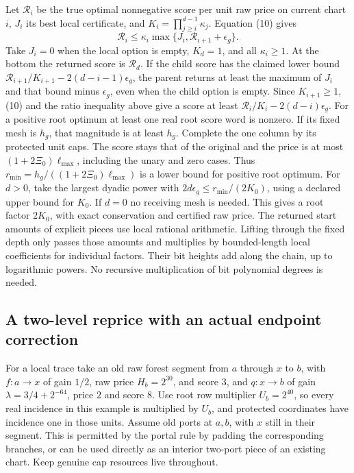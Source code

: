 \documentclass[11pt]{article}
\begin{document}
Let \(\mathcal R_i\) be the true optimal nonnegative score per unit raw price on current chart \(i\), \(J_i\) its best local certificate, and \(K_i=\prod_{j\ge i}^{d-1}\kappa_j\). Equation (10) gives
\[
 \mathcal R_i\le \kappa_i\max\{J_i,\mathcal R_{i+1}+\epsilon_g\}.
\]
Take \(J_i=0\) when the local option is empty, \(K_d=1\), and all \(\kappa_i\ge1\). At the bottom the returned score is \(\mathcal R_d\). If the child score has the claimed lower bound \(\mathcal R_{i+1}/K_{i+1}-2(d-i-1)\epsilon_g\), the parent returns at least the maximum of \(J_i\) and that bound minus \(\epsilon_g\), even when the child option is empty. Since \(K_{i+1}\ge1\), (10) and the ratio inequality above give a score at least \(\mathcal R_i/K_i-2(d-i)\epsilon_g\). For a positive root optimum at least one real root score word is nonzero. If its fixed mesh is \(h_g\), that magnitude is at least \(h_g\). Complete the one column by its protected unit caps. The score stays that of the original and the price is at most \((1+2\Xi_0)\ell_{\max}\), including the unary and zero cases. Thus \(r_{\min}=h_g/((1+2\Xi_0)\ell_{\max})\) is a lower bound for positive root optimum. For \(d>0\), take the largest dyadic power with \(2d\epsilon_g\le r_{\min}/(2K_0)\), using a declared upper bound for \(K_0\). If \(d=0\) no receiving mesh is needed. This gives a root factor \(2K_0\), with exact conservation and certified raw price. The returned start amounts of explicit pieces use local rational arithmetic. Lifting through the fixed depth only passes those amounts and multiplies by bounded-length local coefficients for individual factors. Their bit heights add along the chain, up to logarithmic powers. No recursive multiplication of bit polynomial degrees is needed.

\hypertarget{a-two-level-reprice-with-an-actual-endpoint-correction}{%
\subsection{A two-level reprice with an actual endpoint correction}\label{a-two-level-reprice-with-an-actual-endpoint-correction}}

For a local trace take an old raw forest segment from \(a\) through \(x\) to \(b\), with \(f:a\to x\) of gain \(1/2\), raw price \(H_b=2^{30}\), and score 3, and \(q:x\to b\) of gain \(\lambda=3/4+2^{-64}\), price 2 and score 8. Use root row multiplier \(U_b=2^{40}\), so every real incidence in this example is multiplied by \(U_b\), and protected coordinates have incidence one in those units. Assume old ports at \(a,b\), with \(x\) still in their segment. This is permitted by the portal rule by padding the corresponding branches, or can be used directly as an interior two-port piece of an existing chart. Keep genuine cap resources live throughout.
\end{document}
